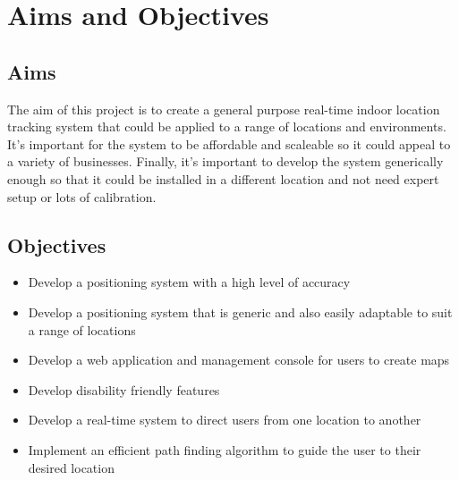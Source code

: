 \section{Aims and Objectives}\label{aimssandobj}
\subsection{Aims}
The aim of this project is to create a general purpose real-time indoor location tracking system that could be applied to a range of locations and environments. It's important for the system  to be affordable and scaleable so it could appeal to a variety of businesses. Finally, it's important to develop the system generically enough so that it could be installed in a different location and not need expert setup or lots of calibration.

\subsection{Objectives}
\begin{itemize}
	\item Develop a positioning system with a high level of accuracy
	\item Develop a positioning system that is generic and also easily adaptable to suit a range of locations
	\item Develop a web application and management console for users to create maps
	\item Develop disability friendly features
	\item Develop a real-time system to direct users from one location to another
	\item Implement an efficient path finding algorithm to guide the user to their desired location
\end{itemize}
\newpage